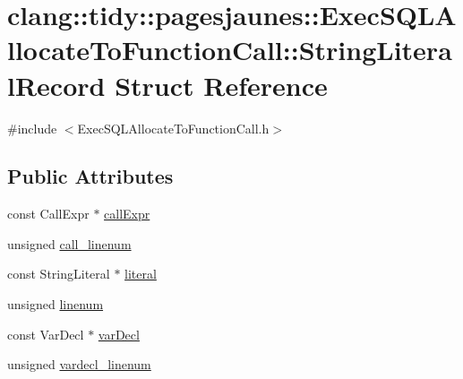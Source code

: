 \hypertarget{structclang_1_1tidy_1_1pagesjaunes_1_1_exec_s_q_l_allocate_to_function_call_1_1_string_literal_record}{}\section{clang\+:\+:tidy\+:\+:pagesjaunes\+:\+:Exec\+S\+Q\+L\+Allocate\+To\+Function\+Call\+:\+:String\+Literal\+Record Struct Reference}
\label{structclang_1_1tidy_1_1pagesjaunes_1_1_exec_s_q_l_allocate_to_function_call_1_1_string_literal_record}


{\ttfamily \#include $<$Exec\+S\+Q\+L\+Allocate\+To\+Function\+Call.\+h$>$}

\subsection*{Public Attributes}
\begin{DoxyCompactItemize}
\item 
const Call\+Expr $\ast$ \hyperlink{structclang_1_1tidy_1_1pagesjaunes_1_1_exec_s_q_l_allocate_to_function_call_1_1_string_literal_record_ac7388bdc8df163dbd96fc22ca1bd3982}{call\+Expr}
\item 
unsigned \hyperlink{structclang_1_1tidy_1_1pagesjaunes_1_1_exec_s_q_l_allocate_to_function_call_1_1_string_literal_record_aa6ea37344f400a625a815b11cb81b340}{call\+\_\+linenum}
\item 
const String\+Literal $\ast$ \hyperlink{structclang_1_1tidy_1_1pagesjaunes_1_1_exec_s_q_l_allocate_to_function_call_1_1_string_literal_record_af7744f3e08b7e53e05b64f5ac293e7c1}{literal}
\item 
unsigned \hyperlink{structclang_1_1tidy_1_1pagesjaunes_1_1_exec_s_q_l_allocate_to_function_call_1_1_string_literal_record_a129a503288281ed9792448a47a0af54e}{linenum}
\item 
const Var\+Decl $\ast$ \hyperlink{structclang_1_1tidy_1_1pagesjaunes_1_1_exec_s_q_l_allocate_to_function_call_1_1_string_literal_record_a8c6ee215ecef2f0a3ddaa77ef29da391}{var\+Decl}
\item 
unsigned \hyperlink{structclang_1_1tidy_1_1pagesjaunes_1_1_exec_s_q_l_allocate_to_function_call_1_1_string_literal_record_a3472a66d96a7dc011d37cf79326517f9}{vardecl\+\_\+linenum}
\end{DoxyCompactItemize}



